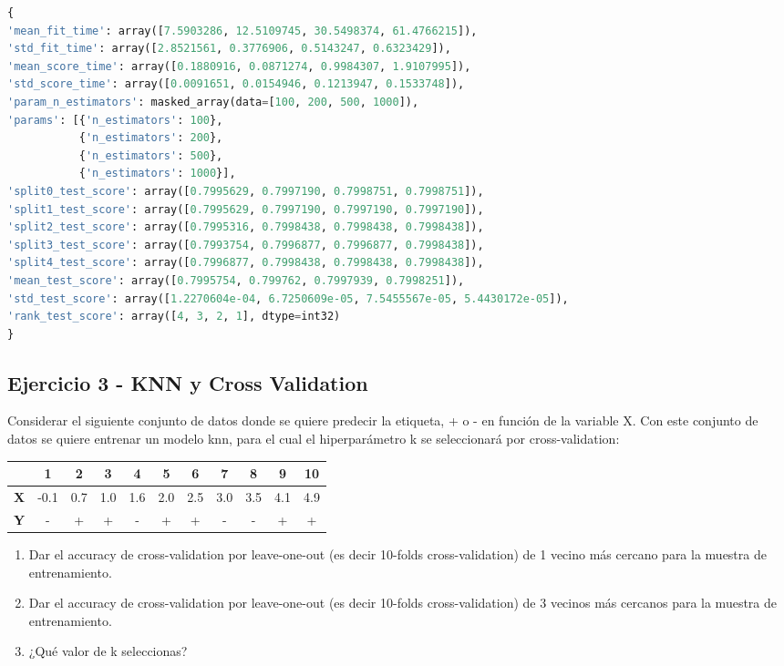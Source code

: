 \documentclass[12pt]{article}
\begin{document}
\begin{lstlisting}[language=Python]
{
'mean_fit_time': array([7.5903286, 12.5109745, 30.5498374, 61.4766215]),
'std_fit_time': array([2.8521561, 0.3776906, 0.5143247, 0.6323429]),
'mean_score_time': array([0.1880916, 0.0871274, 0.9984307, 1.9107995]),
'std_score_time': array([0.0091651, 0.0154946, 0.1213947, 0.1533748]),
'param_n_estimators': masked_array(data=[100, 200, 500, 1000]),
'params': [{'n_estimators': 100},
           {'n_estimators': 200},
           {'n_estimators': 500},
           {'n_estimators': 1000}],
'split0_test_score': array([0.7995629, 0.7997190, 0.7998751, 0.7998751]),
'split1_test_score': array([0.7995629, 0.7997190, 0.7997190, 0.7997190]),
'split2_test_score': array([0.7995316, 0.7998438, 0.7998438, 0.7998438]),
'split3_test_score': array([0.7993754, 0.7996877, 0.7996877, 0.7998438]),
'split4_test_score': array([0.7996877, 0.7998438, 0.7998438, 0.7998438]),
'mean_test_score': array([0.7995754, 0.799762, 0.7997939, 0.7998251]),
'std_test_score': array([1.2270604e-04, 6.7250609e-05, 7.5455567e-05, 5.4430172e-05]),
'rank_test_score': array([4, 3, 2, 1], dtype=int32)
}
\end{lstlisting}

\subsection{Ejercicio 3 - KNN y Cross Validation}

Considerar el siguiente conjunto de datos donde se quiere predecir la etiqueta, + o - en función de la variable X. Con este conjunto de datos se quiere entrenar un modelo knn, para el cual el hiperparámetro k se seleccionará por cross-validation:

\begin{table}[H]
    \centering
    \begin{tabular}{|c|c|c|c|c|c|c|c|c|c|c|}
        \hline
        & \textbf{1} & \textbf{2} & \textbf{3} & \textbf{4} & \textbf{5} & \textbf{6} & \textbf{7} & \textbf{8} & \textbf{9} & \textbf{10} \\
        \hline
        \textbf{X} & -0.1 & 0.7 & 1.0 & 1.6 & 2.0 & 2.5 & 3.0 & 3.5 & 4.1 & 4.9 \\
        \hline
        \textbf{Y} & - & + & + & - & + & + & - & - & + & + \\
        \hline
    \end{tabular}
\end{table}

\begin{enumerate}
    \item Dar el accuracy de cross-validation por leave-one-out (es decir 10-folds cross-validation) de 1 vecino más cercano para la muestra de entrenamiento.
    \item Dar el accuracy de cross-validation por leave-one-out (es decir 10-folds cross-validation) de 3 vecinos más cercanos para la muestra de entrenamiento.
    \item ¿Qué valor de k seleccionas?
\end{enumerate}
\end{document}
